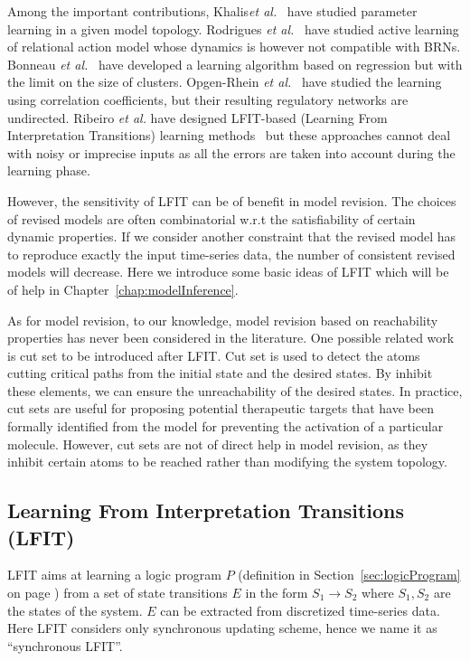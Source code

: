 Among the important contributions, Khalis\textit{et al.}~\cite{khalis2009smbionet} have studied parameter learning in a given model topology.
Rodrigues \textit{et al.}~\cite{rodrigues2011active} have studied active learning of relational action model whose dynamics is however not compatible with BRNs.
Bonneau \textit{et al.}~\cite{bonneau2006inferelator} have developed a learning algorithm based on regression but with the limit on the size of clusters.
Opgen-Rhein \textit{et al.}~\cite{opgen2007correlation} have studied the learning using correlation coefficients, but their resulting regulatory networks are undirected. 
Ribeiro \textit{et al.} have designed LFIT-based (Learning From Interpretation Transitions) learning methods~\cite{ribeiro2015learning,ribeiro2018learning,ribeiro2017inductive} but these approaches cannot deal with noisy or imprecise inputs as all the errors are taken into account during the learning phase.

However, the sensitivity of LFIT can be of benefit in model revision.
The choices of revised models are often combinatorial w.r.t the satisfiability of certain dynamic properties.
If we consider another constraint that the revised model has to reproduce exactly the input time-series data, the number of consistent revised models will decrease.
Here we introduce some basic ideas of LFIT which will be of help in Chapter~\ref{chap:modelInference}.

As for model revision, to our knowledge, model revision based on reachability properties has never been considered in the literature.
One possible related work is cut set to be introduced after LFIT.
Cut set is used to detect the atoms cutting critical paths from the initial state and the desired states.
By inhibit these elements, we can ensure the unreachability of the desired states.
In practice, cut sets are useful for proposing potential therapeutic targets that have been formally identified from the model for preventing the activation of a particular molecule.
However, cut sets are not of direct help in model revision, as they inhibit certain atoms to be reached rather than modifying the system topology.

\subsection{Learning From Interpretation Transitions (LFIT)}\label{sec:lfitSyn}
LFIT aims at learning a logic program $P$ (definition in Section~\ref{sec:logicProgram} on page \pageref{sec:logicProgram}) from a set of state transitions $E$ in the form $S_1\to S_2$ where $S_1,S_2$ are the states of the system.
$E$ can be extracted from discretized time-series data.
Here LFIT considers only synchronous updating scheme, hence we name it as ``synchronous LFIT''.

